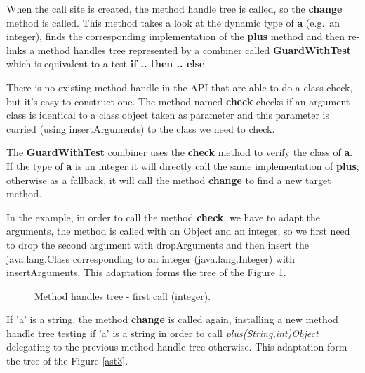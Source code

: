 \documentclass{sig-alternate}
\begin{document}
      When the call site is created, the method handle tree is called, so the {\bf change} method is called.
      This method takes a look at the dynamic type of {\bf a} (e.g.~an integer),
      finds the corresponding implementation of the {\bf plus} method
      and then re-links a method handles tree represented by a combiner called {\bf GuardWithTest}
      which is equivalent to a test {\bf if .. then .. else}.

      There is no existing method handle in the API that are able to do a class check,
      but it's easy to construct one. The method named {\bf check} checks if an argument class
      is identical to a class object taken as parameter and this parameter is curried
      (using insertArguments) to the class we need to check.

      The {\bf GuardWithTest} combiner uses the {\bf check} method to verify the class of {\bf a}.
      If the type of {\bf a} is an integer it will directly call the same implementation of {\bf plus};
      otherwise as a fallback, it will call the method {\bf change} to find a new target method.

      In the example, in order to call the method {\bf check}, we have to adapt the arguments,
      the method is called with an Object and an integer, so we first need to drop the second
      argument with dropArguments and then insert the java.lang.Class corresponding to an integer
      (java.lang.Integer) with insertArguments.
      This adaptation forms the tree of the Figure \ref{ast2}.

      \begin{figure}[!h]
        \hspace{-.6in} \resizebox{1.3\linewidth}{!}{}
        \caption{Method handles tree - first call (integer).}\vspace{-1em}
        \label{ast2}
      \end{figure}

      If 'a' is a string, the method {\bf change} is called again,
      installing a new method handle tree testing if 'a' is a string in order to call {\it plus(String,int)Object}
      delegating to the previous method handle tree otherwise.
      This adaptation form the tree of the Figure \ref{ast3}.

      \begin{figure*}[!b]
        \centering \resizebox{.8\linewidth}{!}{}
        \caption{Method handles tree - second call (string).}\vspace{-1em}
        \label{ast3}
      \end{figure*}
\end{document}
